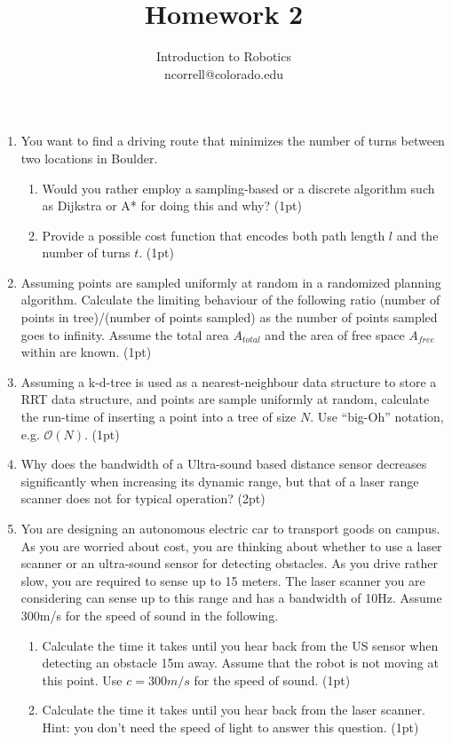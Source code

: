 \documentclass[letter,twoside,11pt]{article}
\begin{document}
\vspace{-50px}
\title{Homework 2}
\author{Introduction to Robotics\\
ncorrell@colorado.edu}
\maketitle

\begin{enumerate}
\item You want to find a driving route that minimizes the number of turns between two locations in Boulder.
\begin{enumerate}
\item Would you rather employ a sampling-based or a discrete algorithm such as Dijkstra or A* for doing this and why?  (1pt)
\item Provide a possible cost function that encodes both path length $l$ and the number of turns $t$. (1pt)
\end{enumerate}
\item Assuming points are sampled uniformly at random in a randomized planning algorithm. Calculate the limiting behaviour of the following ratio   (number of points in tree)/(number of points sampled) as the number of points sampled goes to infinity. Assume the total area $A_{total}$ and the area of free space $A_{free}$ within are known. (1pt) 

\item Assuming a k-d-tree is used as a nearest-neighbour data structure to store a RRT data structure, and points are sample uniformly at random, calculate the  run-time of inserting a point into a tree of size $N$. Use ``big-Oh'' notation, e.g. $\mathcal{O}(N)$. (1pt)

\item Why does the bandwidth of a Ultra-sound based distance sensor decreases significantly when increasing its dynamic range, but that of a laser range scanner does not for typical operation? (2pt)

\item You are designing an autonomous electric car to transport goods on campus. As you are worried about cost, you are thinking about whether to use a laser scanner or an ultra-sound sensor for detecting obstacles. As you drive rather slow, you are required to sense up to 15 meters. The laser scanner you are considering can sense up to this range and has a bandwidth of 10Hz. Assume 300m/s for the speed of sound in the following.
\begin{enumerate}
\item Calculate the time it takes until you hear back from the US sensor when detecting an obstacle 15m away. Assume that the robot is not moving at this point. Use $c=300m/s$ for the speed of sound. (1pt)
\item Calculate the time it takes until you hear back from the laser scanner. Hint: you don't need the speed of light to answer this question. (1pt)     
\end{enumerate}


\end{enumerate}
\end{document}
